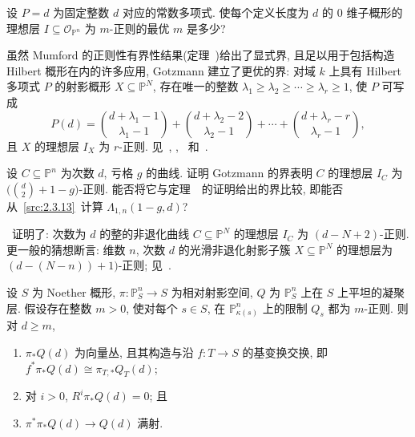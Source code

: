 \begin{exercise}\label{src:2.3.14}
设 $P=d$ 为固定整数 $d$ 对应的常数多项式.
使每个定义长度为 $d$ 的 $0$ 维子概形的理想层 $I\subseteq\mathcal O_{\mathbb P^n}$ 为 $m$-正则的最优 $m$ 是多少?
\end{exercise}
\begin{remark}[最优界]\label{src:2.3.15}
虽然 Mumford 的正则性有界性结果(定理~)给出了显式界, 且足以用于包括构造 Hilbert 概形在内的许多应用, Gotzmann 建立了更优的界: 
对域 $k$ 上具有 Hilbert 多项式 $P$ 的射影概形 $X\subseteq\mathbb P^N$, 存在唯一的整数
$\lambda_1\geq\lambda_2\geq\cdots\geq\lambda_r\geq1$, 使 $P$ 可写成
\[
P(d)=\binom{d+\lambda_1-1}{\lambda_1-1}
+\binom{d+\lambda_2-2}{\lambda_2-1}
+\cdots+\binom{d+\lambda_r-r}{\lambda_r-1},
\]
且 $X$ 的理想层 $I_X$ 为 $r$-正则.
见~\cite{Got78}, \cite[\S$4.3$]{BH93}, \cite{Gre89}~和~\cite[\S$3$]{Gre98}.
\end{remark}
\begin{exercise}\label{src:2.3.16}
设 $C\subseteq\mathbb P^n$ 为次数 $d$, 亏格 $g$ 的曲线.
证明 Gotzmann 的界表明 $C$ 的理想层 $I_C$ 为 $\bigl(\binom d2+1-g\bigr)$-正则.
能否将它与定理~~的证明给出的界比较, 即能否从~\eqref{src:2.3.13}~计算 $\Lambda_{1,n}(1-g,d)$?
\end{exercise}
\begin{remark}\label{src:2.3.17}
\cite{GLP83}~证明了: 次数为 $d$ 的整的非退化曲线 $C\subseteq\mathbb P^N$ 的理想层 $I_C$ 为 $(d-N+2)$-正则.
更一般的猜想断言: 维数 $n$, 次数 $d$ 的光滑非退化射影子簇 $X\subseteq\mathbb P^N$ 的理想层为 $(d-(N-n))+1)$-正则; 见~\cite{GLP83,EG84}.
\end{remark}
\begin{proposition}[族中的正则性]\label{src:2.3.18}
设 $S$ 为 Noether 概形, $\pi:\mathbb P_S^n\to S$ 为相对射影空间, $Q$ 为 $\mathbb P_S^n$ 上在 $S$ 上平坦的凝聚层.
假设存在整数 $m>0$, 使对每个 $s\in S$, 在 $\mathbb P_{\kappa(s)}^n$ 上的限制 $Q_s$ 都为 $m$-正则.
则对 $d\geq m$, 
\begin{enumerate}[(1)]
\item $\pi_*Q(d)$ 为向量丛, 且其构造与沿 $f:T\to S$ 的基变换交换, 即 $f^*\pi_*Q(d)\cong\pi_{T,*}Q_T(d)$; 
\item 对 $i>0$, $R^i\pi_*Q(d)=0$; 且
\item $\pi^*\pi_*Q(d)\to Q(d)$ 满射.
\end{enumerate}
\end{proposition}
